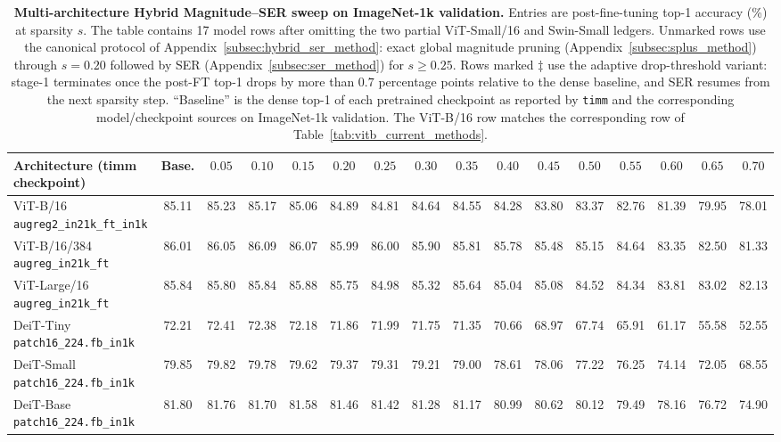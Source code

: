 \documentclass[11pt]{article}
\theoremstyle{plain}
\theoremstyle{definition}
\theoremstyle{remark}
\newcommand{\1}{\mathbf{1}}
\begin{document}
\begin{table}[ht]
\centering
\caption{\textbf{Multi-architecture Hybrid Magnitude--SER sweep on ImageNet-1k validation.}  Entries are post-fine-tuning top-1 accuracy (\%) at sparsity \(s\).  The table contains 17 model rows after omitting the two partial ViT-Small/16 and Swin-Small ledgers.  Unmarked rows use the canonical protocol of Appendix~\ref{subsec:hybrid_ser_method}: exact global magnitude pruning (Appendix~\ref{subsec:splus_method}) through \(s=0.20\) followed by SER (Appendix~\ref{subsec:ser_method}) for \(s\ge0.25\).  Rows marked \(\ddagger\) use the adaptive drop-threshold variant: stage-1 terminates once the post-FT top-1 drops by more than \(0.7\) percentage points relative to the dense baseline, and SER resumes from the next sparsity step.  ``Baseline'' is the dense top-1 of each pretrained checkpoint as reported by \texttt{timm} \cite{rw2019timm} and the corresponding model/checkpoint sources on ImageNet-1k validation.  The ViT-B/16 row matches the corresponding row of Table~\ref{tab:vitb_current_methods}.}
\label{tab:multi_arch_hybrid}
\tiny
\setlength{\tabcolsep}{1.0pt}
\begin{tabular}{lccccccccccccccc}
\toprule
Architecture (timm checkpoint) & Base. & \(0.05\) & \(0.10\) & \(0.15\) & \(0.20\) & \(0.25\) & \(0.30\) & \(0.35\) & \(0.40\) & \(0.45\) & \(0.50\) & \(0.55\) & \(0.60\) & \(0.65\) & \(0.70\) \\
\midrule
ViT-B/16 \texttt{augreg2\_in21k\_ft\_in1k} & 85.11 & 85.23 & 85.17 & 85.06 & 84.89 & 84.81 & 84.64 & 84.55 & 84.28 & 83.80 & 83.37 & 82.76 & 81.39 & 79.95 & 78.01 \\
ViT-B/16/384 \texttt{augreg\_in21k\_ft}    & 86.01 & 86.05 & 86.09 & 86.07 & 85.99 & 86.00 & 85.90 & 85.81 & 85.78 & 85.48 & 85.15 & 84.64 & 83.35 & 82.50 & 81.33 \\
ViT-Large/16 \texttt{augreg\_in21k\_ft}    & 85.84 & 85.80 & 85.84 & 85.88 & 85.75 & 84.98 & 85.32 & 85.64 & 85.04 & 85.08 & 84.52 & 84.34 & 83.81 & 83.02 & 82.13 \\
DeiT-Tiny \texttt{patch16\_224.fb\_in1k}   & 72.21 & 72.41 & 72.38 & 72.18 & 71.86 & 71.99 & 71.75 & 71.35 & 70.66 & 68.97 & 67.74 & 65.91 & 61.17 & 55.58 & 52.55 \\
DeiT-Small \texttt{patch16\_224.fb\_in1k}  & 79.85 & 79.82 & 79.78 & 79.62 & 79.37 & 79.31 & 79.21 & 79.00 & 78.61 & 78.06 & 77.22 & 76.25 & 74.14 & 72.05 & 68.55 \\
DeiT-Base \texttt{patch16\_224.fb\_in1k}   & 81.80 & 81.76 & 81.70 & 81.58 & 81.46 & 81.42 & 81.28 & 81.17 & 80.99 & 80.62 & 80.12 & 79.49 & 78.16 & 76.72 & 74.90 \\

\end{tabular}
\end{table}
\end{document}

